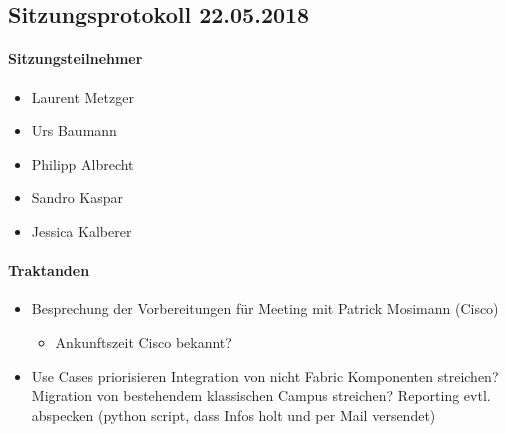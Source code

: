 \subsection{Sitzungsprotokoll 22.05.2018}

\paragraph{Sitzungsteilnehmer}
\begin{itemize}	
	\item Laurent Metzger 
	\item Urs Baumann
	\item Philipp Albrecht
	\item Sandro Kaspar
	\item Jessica Kalberer
\end{itemize}

\paragraph{Traktanden}
\begin{itemize}	
	\item Besprechung der Vorbereitungen für Meeting mit Patrick Mosimann (Cisco)
	\begin{itemize}
		\item Ankunftszeit Cisco bekannt?
	\end{itemize}
	\item Use Cases priorisieren
		\subitem Integration von nicht Fabric Komponenten streichen?
		\subitem Migration von bestehendem klassischen Campus streichen?
		\subitem Reporting evtl. abspecken (python script, dass Infos holt und per Mail versendet)
\end{itemize}

